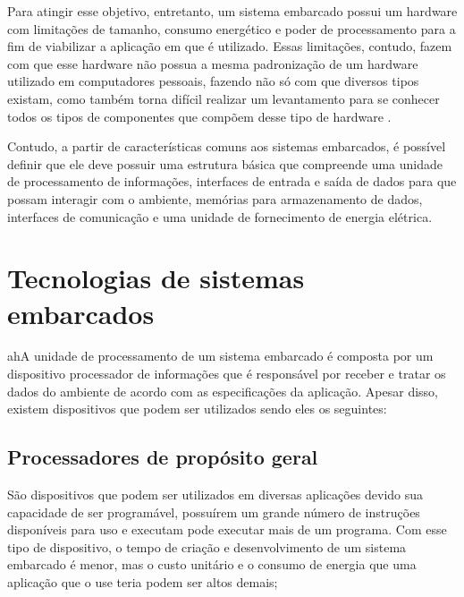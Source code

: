 Para atingir esse objetivo, entretanto, um sistema embarcado possui um hardware com limitações de tamanho, consumo energético e poder de processamento para a fim de viabilizar a aplicação em que é utilizado. Essas limitações, contudo, fazem com que esse hardware não possua a mesma padronização de um hardware utilizado em computadores pessoais, fazendo não só com que diversos tipos existam, como também torna difícil realizar um levantamento para se conhecer todos os tipos de componentes que compõem desse tipo de hardware \cite{marwedel2021embedded}. 

Contudo, a partir de características comuns aos sistemas embarcados, é possível definir que ele deve possuir uma estrutura básica que compreende uma unidade de processamento de informações, interfaces de entrada e saída de dados para que possam interagir com o ambiente, memórias para armazenamento de dados, interfaces de comunicação e uma unidade de fornecimento de energia elétrica. 


\section{Tecnologias de sistemas embarcados}


ahA unidade de processamento de um sistema embarcado é composta por um dispositivo processador de informações que é responsável por receber e tratar os dados do ambiente de acordo com as especificações da aplicação. Apesar disso, existem dispositivos que podem ser utilizados sendo eles os seguintes:


    \subsection{Processadores de propósito geral } São dispositivos que podem ser utilizados em diversas aplicações devido sua capacidade de ser programável, possuírem um grande número de instruções disponíveis para  uso e executam pode executar mais de um programa. Com esse tipo de dispositivo, o tempo de criação e desenvolvimento de um sistema embarcado é menor, mas o custo unitário e o consumo de energia que uma aplicação que o use teria podem ser altos demais;
    
